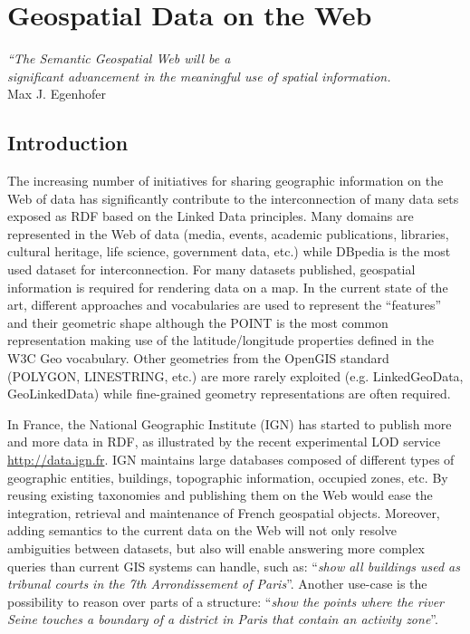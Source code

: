 \chapter{Geospatial Data on the Web}
\label{ch:ch1}

\begin{flushright}
\textit{``The Semantic Geospatial Web will be a \\ significant advancement in the 
 meaningful use of spatial information.}\cite{egenhofer12}\\
 Max J. Egenhofer 
 
\end{flushright}



 
\section{Introduction}
The increasing number of initiatives for sharing geographic information on the Web of data has significantly contribute to the interconnection of many data sets exposed as RDF based on the Linked Data principles. Many domains are represented in the Web of data (media, events, academic publications, libraries, cultural heritage, life science, government data, etc.) while DBpedia is the most used dataset for interconnection. For many datasets published, geospatial information is required for rendering data on a map. In the current state of the art, different approaches and vocabularies are used to represent the ``features'' and their geometric shape although the POINT is the most common representation making use of the latitude/longitude properties defined in the W3C Geo vocabulary. Other geometries from the OpenGIS standard (POLYGON, LINESTRING, etc.) are more rarely exploited (e.g. LinkedGeoData, GeoLinkedData) while fine-grained geometry representations are often required.

In France, the National Geographic Institute (IGN) has started to publish more and more data in RDF, as illustrated by the recent experimental LOD service \url{http://data.ign.fr}. IGN maintains large databases composed of different types of geographic entities, buildings, topographic information, occupied zones, etc. By reusing existing taxonomies and publishing them on the Web would ease the integration, retrieval and maintenance of French geospatial objects. Moreover, adding semantics to the current data on the Web will not only resolve ambiguities between datasets, but also will enable answering more complex queries than current GIS systems can handle, such as: ``\emph{show all buildings used as tribunal courts in the 7th Arrondissement of Paris}''. Another use-case is the possibility to reason over parts of a structure: ``\emph{show the points where the river Seine touches a boundary of a district in Paris that contain an activity zone}''.

